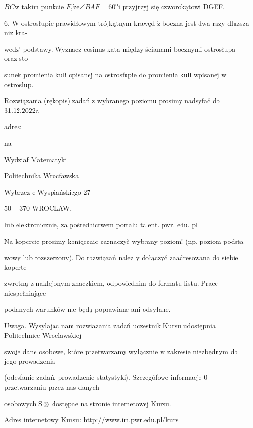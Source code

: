 \documentclass[a4paper,12pt]{article}
\begin{document}
$BC\mathrm{w}$ takim punkcie $F, \dot{\mathrm{z}}\mathrm{e}\angle BAF=60^{\mathrm{o}}\mathrm{i}$ przyjrzyj się czworokątowi DGEF.

6. $\mathrm{W}$ ostrosłupie prawidłowym trójkątnym krawęd $\acute{\mathrm{z}}$ boczna jest dwa razy dluzsza $\mathrm{n}\mathrm{i}\dot{\mathrm{z}}$ kra-

wedz' podstawy. Wyznacz cosinus kata między ścianami bocznymi ostrosłupa oraz sto-

sunek promienia kuli opisanej na ostrosfupie do promienia kuli wpisanej $\mathrm{w}$ ostroslup.

Rozwiązania (rękopis) zadań z wybranego poziomu prosimy nadsyfač do 31.12.2022r.

adres:

na

Wydziaf Matematyki

Politechnika Wrocfawska

Wybrzez $\mathrm{e}$ Wyspiańskiego 27

$50-370$ WROCLAW,

lub elektronicznie, za pośrednictwem portalu talent. $\mathrm{p}\mathrm{w}\mathrm{r}$. edu. pl

Na kopercie prosimy $\underline{\mathrm{k}\mathrm{o}\mathrm{n}\mathrm{i}\mathrm{e}\mathrm{c}\mathrm{z}\mathrm{n}\mathrm{i}\mathrm{e}}$ zaznaczyč wybrany poziom! (np. poziom podsta-

wowy lub rozszerzony). Do rozwiązań nalez $\mathrm{y}$ dołączyč zaadresowana do siebie koperte

zwrotną $\mathrm{z}$ naklejonym znaczkiem, odpowiednim do formatu listu. Prace niespełniające

podanych warunków nie będą poprawiane ani odsyłane.

Uwaga. Wysylajac nam rozwiazania zadań uczestnik Kursu udostępnia Politechnice Wroclawskiej

swoje dane osobowe, które przetwarzamy wyłącznie $\mathrm{w}$ zakresie niezbędnym do jego prowadzenia

(odesfanie zadań, prowadzenie statystyki). Szczegófowe informacje $0$ przetwarzaniu przez nas danych

osobowych $\mathrm{S}\otimes$ dostępne na stronie internetowej Kursu.

Adres internetowy Kursu: http://www.im.pwr.edu.pl/kurs
\end{document}
